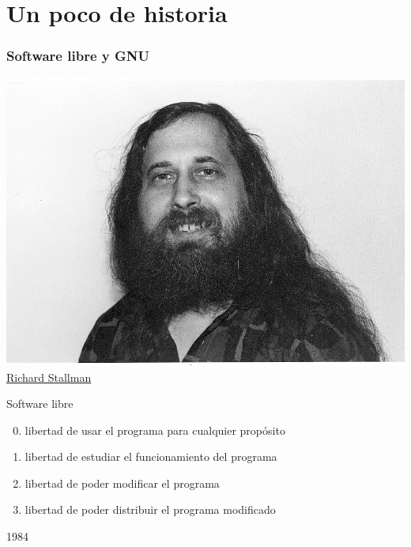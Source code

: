 \documentclass[hyperref={colorlinks}]{beamer}
\begin{document}
\section{Un poco de historia}
\begin{frame}
    \frametitle{Software libre y GNU}
    \begin{minipage}{.4\linewidth}
    \includegraphics[width=.9\linewidth]{figs/rms.jpeg}\\ 
    \centering\href{https://es.wikipedia.org/wiki/Richard_Stallman}{Richard Stallman}
    \end{minipage}
    \pause
    \begin{minipage}{.55\linewidth}
    \begin{block}{Software libre}
        \begin{enumerate}
        \setcounter{enumi}{-1}
        \item libertad de usar el programa para cualquier prop\'osito
        \item libertad de estudiar el funcionamiento del programa
        \item libertad de poder modificar el programa
        \item libertad de poder distribuir el programa modificado
        \end{enumerate}
    \end{block}
    \pause
    \begin{block}{1984}
        \begin{minipage}{.2\linewidth}

\end{minipage}
\end{block}
\end{minipage}
\end{frame}
\end{document}
